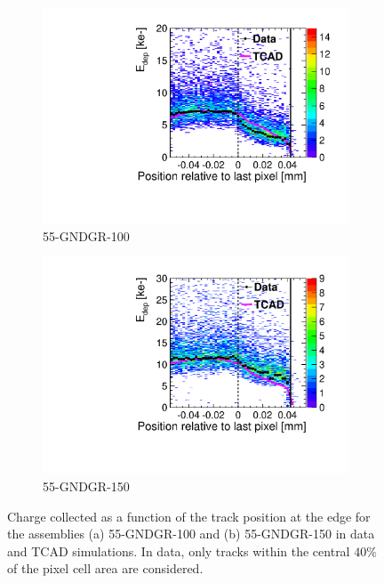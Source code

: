 \begin{figure}[htbp]
  \begin{subfigure}[b]{0.45\textwidth}
    \centering
    \includegraphics[width=\textwidth]{figures/ActiveEdge/55_GNDGR_100_Edep_TCAD_data.pdf}
  \caption{55-GNDGR-100}
  \end{subfigure}\hfill
  \begin{subfigure}[b]{0.45\textwidth}
    \centering
    \includegraphics[width=\textwidth]{figures/ActiveEdge/55_GNDGR_150_Edep_TCAD_data.pdf}
  \caption{55-GNDGR-150}
  \end{subfigure}
  \caption{Charge collected as a function of the track position at the
    edge for the assemblies (a) 55-GNDGR-100 and (b) 55-GNDGR-150 in
    data and TCAD simulations. In data, only tracks within the central
    $40\%$ of the pixel cell area are considered.}
  \label{fig:ChargeCollectionThickGNDGR}
\end{figure}


